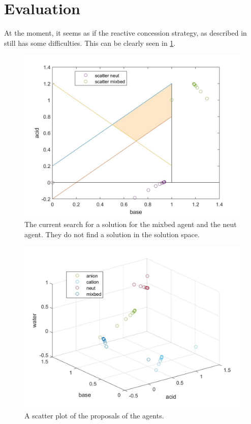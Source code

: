 \section{Evaluation}
At the moment, it seems as if the reactive concession strategy, as described in \citet{zheng2015automated} still has some difficulties. This can be clearly seen in \cref{fig:solution-mixbed-neut}. 
\begin{figure}[h]
	\centering
	\includegraphics[width=0.7\linewidth]{"img/solution mixbed neut"}
	\caption{The current search for a solution for the mixbed agent and the neut agent. They do not find a solution in the solution space.}
	\label{fig:solution-mixbed-neut}
\end{figure}

\begin{figure}[h]
	\centering
	\includegraphics[width=0.7\linewidth]{img/scatter_of_proposals}
	\caption{A scatter plot of the proposals of the agents.}
	\label{fig:scatterofproposals}
\end{figure}


